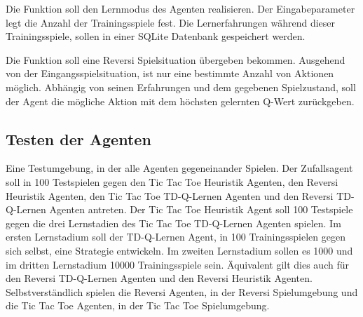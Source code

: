 Die Funktion soll den Lernmodus des Agenten realisieren. Der Eingabeparameter legt die Anzahl der Trainingsspiele fest. Die Lernerfahrungen während dieser Trainingsspiele, sollen in einer SQLite Datenbank gespeichert werden.

Die Funktion soll eine Reversi Spielsituation übergeben bekommen. Ausgehend von der Eingangsspielsituation, ist nur eine bestimmte Anzahl von Aktionen möglich. Abhängig von seinen Erfahrungen und dem gegebenen Spielzustand, soll der Agent die mögliche Aktion mit dem höchsten gelernten Q-Wert zurückgeben.

\subsection{Testen der Agenten}
Eine Testumgebung, in der alle Agenten gegeneinander Spielen. Der Zufallsagent soll in 100 Testspielen gegen den Tic Tac Toe Heuristik Agenten, den Reversi Heuristik Agenten, den Tic Tac Toe TD-Q-Lernen Agenten und den Reversi TD-Q-Lernen Agenten antreten. Der Tic Tac Toe Heuristik Agent soll 100 Testspiele gegen die drei Lernstadien des Tic Tac Toe TD-Q-Lernen Agenten spielen. Im ersten Lernstadium soll der TD-Q-Lernen Agent, in 100 Trainingsspielen gegen sich selbst, eine Strategie entwickeln. Im zweiten Lernstadium sollen es 1000 und im dritten Lernstadium 10000 Trainingsspiele sein. Äquivalent gilt dies auch für den Reversi TD-Q-Lernen Agenten und den Reversi Heuristik Agenten. Selbstverständlich spielen die Reversi Agenten, in der Reversi Spielumgebung und die Tic Tac Toe Agenten, in der Tic Tac Toe Spielumgebung.
